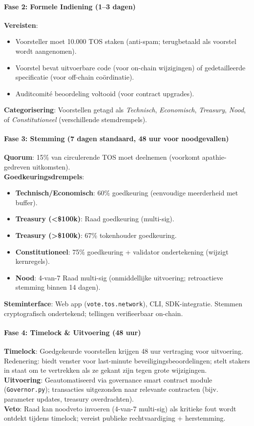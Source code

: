 \documentclass[11pt]{article}
\begin{document}
\paragraph{Fase 2: Formele Indiening (1--3 dagen)}
\textbf{Vereisten}:
\begin{itemize}[noitemsep]
  \item Voorsteller moet 10.000 TOS staken (anti-spam; terugbetaald als voorstel wordt aangenomen).
  \item Voorstel bevat uitvoerbare code (voor on-chain wijzigingen) of gedetailleerde specificatie (voor off-chain coördinatie).
  \item Auditcomité beoordeling voltooid (voor contract upgrades).
\end{itemize}
\textbf{Categorisering}: Voorstellen getagd als \emph{Technisch}, \emph{Economisch}, \emph{Treasury}, \emph{Nood}, of \emph{Constitutioneel} (verschillende stemdrempels).

\paragraph{Fase 3: Stemming (7 dagen standaard, 48 uur voor noodgevallen)}
\textbf{Quorum}: 15\% van circulerende TOS moet deelnemen (voorkomt apathie-gedreven uitkomsten).\\
\textbf{Goedkeuringsdrempels}:
\begin{itemize}[noitemsep]
  \item \textbf{Technisch/Economisch}: 60\% goedkeuring (eenvoudige meerderheid met buffer).
  \item \textbf{Treasury (<\$100k)}: Raad goedkeuring (multi-sig).
  \item \textbf{Treasury (>\$100k)}: 67\% tokenhouder goedkeuring.
  \item \textbf{Constitutioneel}: 75\% goedkeuring + validator ondertekening (wijzigt kernregels).
  \item \textbf{Nood}: 4-van-7 Raad multi-sig (onmiddellijke uitvoering; retroactieve stemming binnen 14 dagen).
\end{itemize}
\textbf{Steminterface}: Web app (\texttt{vote.tos.network}), CLI, SDK-integratie. Stemmen cryptografisch ondertekend; tellingen verifieerbaar on-chain.

\paragraph{Fase 4: Timelock \& Uitvoering (48 uur)}
\textbf{Timelock}: Goedgekeurde voorstellen krijgen 48 uur vertraging voor uitvoering. Redenering: biedt venster voor last-minute beveiligingsbeoordelingen; stelt stakers in staat om te vertrekken als ze gekant zijn tegen grote wijzigingen.\\
\textbf{Uitvoering}: Geautomatiseerd via governance smart contract module (\texttt{Governor.py}); transacties uitgezonden naar relevante contracten (bijv. parameter updates, treasury overdrachten).\\
\textbf{Veto}: Raad kan noodveto invoeren (4-van-7 multi-sig) als kritieke fout wordt ontdekt tijdens timelock; vereist publieke rechtvaardiging + herstemming.
\end{document}
